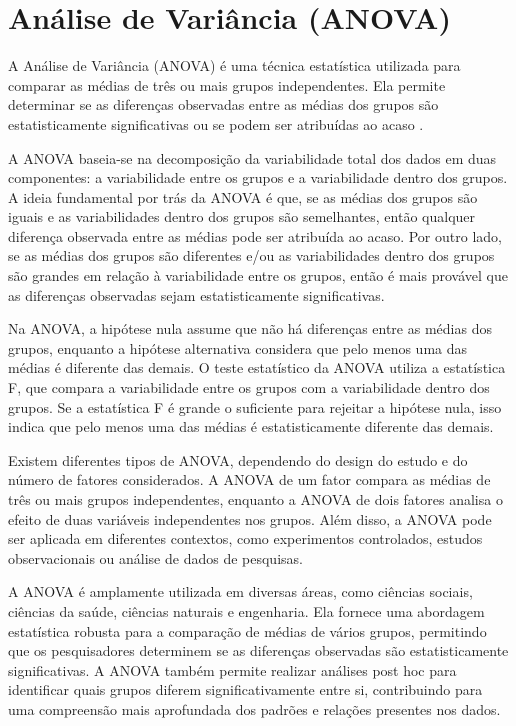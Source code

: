 \chapter{Análise de Variância (ANOVA)}

A Análise de Variância (ANOVA) é uma técnica estatística utilizada para comparar as médias de três ou mais grupos independentes. Ela permite determinar se as diferenças observadas entre as médias dos grupos são estatisticamente significativas ou se podem ser atribuídas ao acaso \parencite{Triola2017}.

A ANOVA baseia-se na decomposição da variabilidade total dos dados em duas componentes: a variabilidade entre os grupos e a variabilidade dentro dos grupos. A ideia fundamental por trás da ANOVA é que, se as médias dos grupos são iguais e as variabilidades dentro dos grupos são semelhantes, então qualquer diferença observada entre as médias pode ser atribuída ao acaso. Por outro lado, se as médias dos grupos são diferentes e/ou as variabilidades dentro dos grupos são grandes em relação à variabilidade entre os grupos, então é mais provável que as diferenças observadas sejam estatisticamente significativas.

Na ANOVA, a hipótese nula assume que não há diferenças entre as médias dos grupos, enquanto a hipótese alternativa considera que pelo menos uma das médias é diferente das demais. O teste estatístico da ANOVA utiliza a estatística F, que compara a variabilidade entre os grupos com a variabilidade dentro dos grupos. Se a estatística F é grande o suficiente para rejeitar a hipótese nula, isso indica que pelo menos uma das médias é estatisticamente diferente das demais.

Existem diferentes tipos de ANOVA, dependendo do design do estudo e do número de fatores considerados. A ANOVA de um fator compara as médias de três ou mais grupos independentes, enquanto a ANOVA de dois fatores analisa o efeito de duas variáveis independentes nos grupos. Além disso, a ANOVA pode ser aplicada em diferentes contextos, como experimentos controlados, estudos observacionais ou análise de dados de pesquisas.

A ANOVA é amplamente utilizada em diversas áreas, como ciências sociais, ciências da saúde, ciências naturais e engenharia. Ela fornece uma abordagem estatística robusta para a comparação de médias de vários grupos, permitindo que os pesquisadores determinem se as diferenças observadas são estatisticamente significativas. A ANOVA também permite realizar análises post hoc para identificar quais grupos diferem significativamente entre si, contribuindo para uma compreensão mais aprofundada dos padrões e relações presentes nos dados.